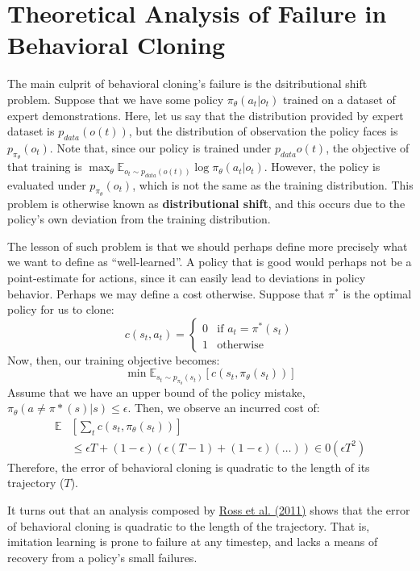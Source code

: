 \section{Theoretical Analysis of Failure in Behavioral Cloning}
The main culprit of behavioral cloning's failure is the dsitributional shift problem.
Suppose that we have some policy $\pi_\theta (a_t | o_t)$ trained on a dataset of expert demonstrations.
Here, let us say that the distribution provided by expert dataset is $p_{data}(o(t))$, but the distribution of observation the policy faces is $p_{\pi_\theta}(o_t)$.
Note that, since our policy is trained under $p_{data} o(t)$, the objective of that training is $\max_\theta \mathbb{E}_{o_t \sim p_{data}(o(t))} \log \pi_\theta (a_t | o_t)$.
However, the policy is evaluated under $p_{\pi_\theta}(o_t)$, which is not the same as the training distribution.
This problem is otherwise known as \textbf{distributional shift}, and this occurs due to the policy's own deviation from the training distribution.

The lesson of such problem is that we should perhaps define more precisely what we want to define as ``well-learned''.
A policy that is good would perhaps not be a point-estimate for actions, since it can easily lead to deviations in policy behavior.
Perhaps we may define a cost otherwise. Suppose that $\pi^*$ is the optimal policy for us to clone:
\[
    c(s_t, a_t) = \begin{cases}
        0 & \text{if } a_t = \pi^* (s_t) \\
        1 & \text{otherwise}
    \end{cases}
\]
Now, then, our training objective becomes:
\[
    \min \mathbb{E}_{s_t \sim p_{\pi_\theta} (s_t)} [c(s_t, \pi_\theta (s_t))]
\]
Assume that we have an upper bound of the policy mistake, $\pi_\theta(a \neq \pi*(s) | s) \leq \epsilon$.
Then, we observe an incurred cost of:
\begin{align*}
    \mathbb{E} &[\sum_t c(s_t, \pi_\theta (s_t))] \\
    &\leq \epsilon T + (1 - \epsilon) (\epsilon (T - 1) + (1 - \epsilon) (\dots)) \in 0(\epsilon T^2)
\end{align*}
Therefore, the error of behavioral cloning is quadratic to the length of its trajectory ($T$).

It turns out that an analysis composed by \href{https://arxiv.org/abs/1011.0686}{Ross et al. (2011)} shows that the error of behavioral cloning is quadratic to the length of the trajectory.
That is, imitation learning is prone to failure at any timestep, and lacks a means of recovery from a policy's small failures.

